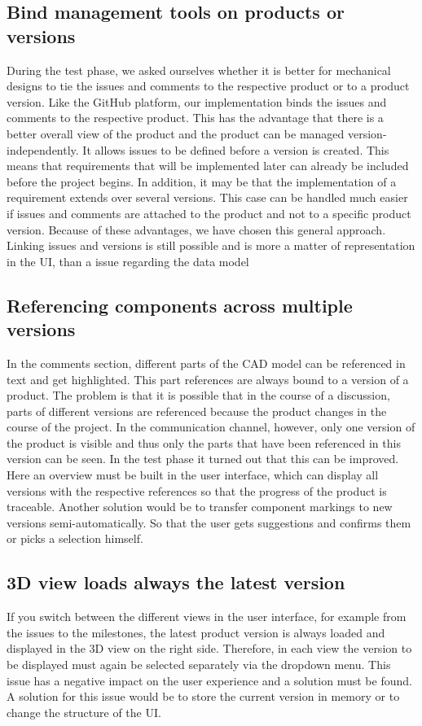 \subsection*{Bind management tools on products or versions}
During the test phase, we asked ourselves whether it is better for mechanical designs to tie the issues and comments to the respective product or to a product version. Like the GitHub platform, our implementation binds the issues and comments to the respective product. This has the advantage that there is a better overall view of the product and the product can be managed version-independently. It allows issues to be defined before a version is created. This means that requirements that will be implemented later can already be included before the project begins. In addition, it may be that the implementation of a requirement extends over several versions. This case can be handled much easier if issues and comments are attached to the product and not to a specific product version.
Because of these advantages, we have chosen this general approach. Linking issues and versions is still possible and is more a matter of representation in the UI, than a issue regarding the data model

\subsection*{Referencing components across multiple versions}
In the comments section, different parts of the CAD model can be referenced in text and get highlighted. This part references are always bound to a version of a product. The problem is that it is possible that in the course of a discussion, parts of different versions are referenced because the product changes in the course of the project. In the communication channel, however, only one version of the product is visible and thus only the parts that have been referenced in this version can be seen. In the test phase it turned out that this can be improved. Here an overview must be built in the user interface, which can display all versions with the respective references so that the progress of the product is traceable. Another solution would be to transfer component markings to new versions semi-automatically. So that the user gets suggestions and confirms them or picks a selection himself.

\subsection*{3D view loads always the latest version}
If you switch between the different views in the user interface, for example from the issues to the milestones, the latest product version is always loaded and displayed in the 3D view on the right side. Therefore, in each view the version to be displayed must again be selected separately via the dropdown menu. This issue has a negative impact on the user experience and a solution must be found.
A solution for this issue would be to store the current version in memory or to change the structure of the UI.

